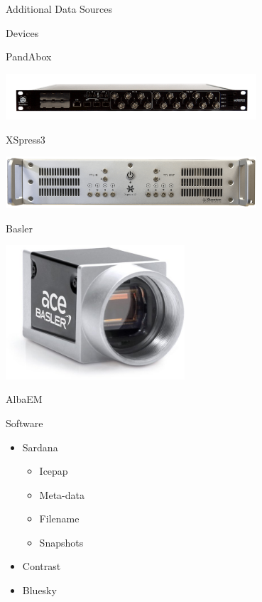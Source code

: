 \documentclass[aspectratio=169]{beamer}
\begin{document}
\begin{frame}{Additional Data Sources}

\begin{minipage}[t]{0.5\textwidth}
  \begin{block}{Devices}
  \centering

  PandAbox

   \includegraphics[width=0.7\textwidth]{dets/panda}


   XSpress3

   \includegraphics[width=0.7\textwidth]{dets/xspress}

   Basler

   \includegraphics[width=0.5\textwidth]{dets/basler}

  AlbaEM
  \end{block}

\end{minipage}
\begin{minipage}[t]{0.49\textwidth}
\begin{block}{Software}
 \begin{itemize}
  \item Sardana
  \begin{itemize}
   \item Icepap
   \item Meta-data
   \item Filename
   \item Snapshots
  \end{itemize}

  \item Contrast
  \item Bluesky
 \end{itemize}
 \end{block}
\end{minipage}

\end{frame}
\end{document}
